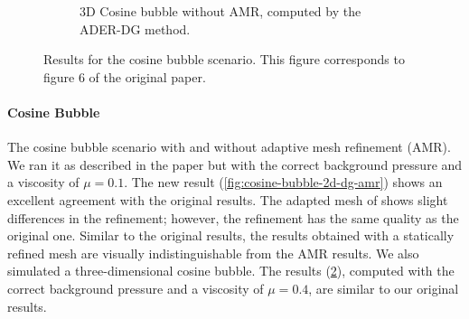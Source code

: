 \documentclass[runningheads]{llncs}
\begin{document}
\begin{figure}[tb]
\begin{subfigure}[t]{0.45\columnwidth}
  \caption{\label{fig:cosine-bubble-3d-dg-noamr}%
  3D Cosine bubble without AMR, computed by the ADER-DG method.}
  \end{subfigure}
\caption{
  Results for the cosine bubble scenario.
  This figure corresponds to figure 6 of the original paper.
}
\end{figure}
\paragraph{Cosine Bubble}
The cosine bubble scenario with and without adaptive mesh refinement (AMR).
We ran it as described in the paper but with the correct background pressure and a viscosity of $\mu=0.1$. 
The new result (\cref{fig:cosine-bubble-2d-dg-amr}) shows an excellent agreement with the original results.
The adapted mesh of shows slight differences in the refinement; however, the refinement has the same quality as the original one.
Similar to the original results, the results obtained with a statically refined mesh are visually indistinguishable from the AMR results.
We also simulated a three-dimensional cosine bubble.
The results (\cref{fig:cosine-bubble-3d-dg-noamr}), computed with the correct background pressure and a viscosity of $\mu=0.4$, are similar to our original results.
\end{document}
